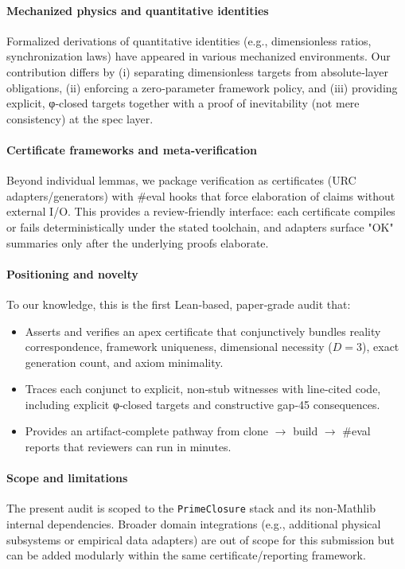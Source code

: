 \documentclass{article}
\begin{document}
\paragraph{Mechanized physics and quantitative identities} Formalized derivations of quantitative identities (e.g., dimensionless ratios, synchronization laws) have appeared in various mechanized environments. Our contribution differs by (i) separating dimensionless targets from absolute‑layer obligations, (ii) enforcing a zero‑parameter framework policy, and (iii) providing explicit, φ‑closed targets together with a proof of inevitability (not mere consistency) at the spec layer.

\paragraph{Certificate frameworks and meta‑verification} Beyond individual lemmas, we package verification as certificates (URC adapters/generators) with #eval hooks that force elaboration of claims without external I/O. This provides a review‑friendly interface: each certificate compiles or fails deterministically under the stated toolchain, and adapters surface "OK" summaries only after the underlying proofs elaborate.

\paragraph{Positioning and novelty} To our knowledge, this is the first Lean‑based, paper‑grade audit that:
\begin{itemize}[leftmargin=*]
  \item Asserts and verifies an apex certificate that conjunctively bundles reality correspondence, framework uniqueness, dimensional necessity (\(D=3\)), exact generation count, and axiom minimality.
  \item Traces each conjunct to explicit, non‑stub witnesses with line‑cited code, including explicit φ‑closed targets and constructive gap‑45 consequences.
  \item Provides an artifact‑complete pathway from clone \(\rightarrow\) build \(\rightarrow\) #eval reports that reviewers can run in minutes.
\end{itemize}

\paragraph{Scope and limitations} The present audit is scoped to the \texttt{PrimeClosure} stack and its non‑Mathlib internal dependencies. Broader domain integrations (e.g., additional physical subsystems or empirical data adapters) are out of scope for this submission but can be added modularly within the same certificate/reporting framework.
\end{document}
